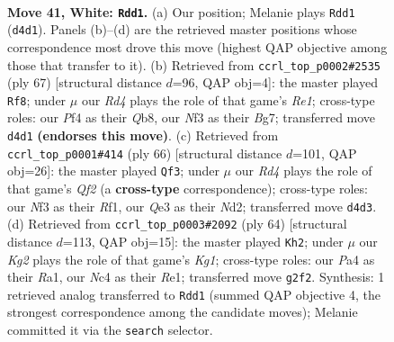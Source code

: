 \documentclass[11pt]{article}
\begin{document}
\clearpage

\begin{figure}[p]\centering
\begin{subfigure}{0.46\textwidth}\centering
\resizebox{\linewidth}{!}{%
\newchessgame
\chessboard[
  setfen={rnb2q2/1p4k1/4p3/p2r1p1p/PnNR1P2/1P2QNP1/4B1KP/7R w - - 1 41},
  showmover=false,
  pgfstyle=straightmove, color=movearrow, markmove={d4-d1}
]}
\caption{}
\end{subfigure}\hfill
\begin{subfigure}{0.46\textwidth}\centering
\resizebox{\linewidth}{!}{%
\newchessgame
\chessboard[
  setfen={1q2r3/5pbk/2rp2pp/1p1NnP1n/1P2P3/7P/P2R1QBK/B4R2 b - - 6 34},
  showmover=false,
  pgfstyle=straightmove, color=movearrow, markmove={e8-f8}
]}
\caption{}
\end{subfigure}
\\[4pt]
\begin{subfigure}{0.46\textwidth}\centering
\resizebox{\linewidth}{!}{%
\newchessgame
\chessboard[
  setfen={1rnqr2k/1p4p1/p2p2bp/P2P1p2/1BNP3b/7P/1RPN1QP1/5RK1 w - - 13 34},
  showmover=false,
  pgfstyle=straightmove, color=movearrow, markmove={f2-f3}
]}
\caption{}
\end{subfigure}\hfill
\begin{subfigure}{0.46\textwidth}\centering
\resizebox{\linewidth}{!}{%
\newchessgame
\chessboard[
  setfen={1rrq2k1/5pp1/p2p1nnp/1b1Pp3/1PN1P3/1Q5P/3N1PP1/R3RBK1 w - - 3 33},
  showmover=false,
  pgfstyle=straightmove, color=movearrow, markmove={g1-h2}
]}
\caption{}
\end{subfigure}
\caption{\textbf{Move 41, White: \texttt{Rdd1}.} (a) Our position; Melanie plays \texttt{Rdd1} (\texttt{d4d1}). Panels (b)--(d) are the retrieved master positions whose correspondence most drove this move (highest QAP objective among those that transfer to it). (b) Retrieved from \texttt{ccrl\_top\_p0002\#2535} (ply 67) [structural distance $d$=96, QAP obj=4]: the master played \texttt{Rf8}; under $\mu$ our \emph{Rd4} plays the role of that game's \emph{Re1}; cross-type roles: our \emph{P}f4 as their \emph{Q}b8, our \emph{N}f3 as their \emph{B}g7; transferred move \texttt{d4d1} \textbf{(endorses this move)}. (c) Retrieved from \texttt{ccrl\_top\_p0001\#414} (ply 66) [structural distance $d$=101, QAP obj=26]: the master played \texttt{Qf3}; under $\mu$ our \emph{Rd4} plays the role of that game's \emph{Qf2} (a \textbf{cross-type} correspondence); cross-type roles: our \emph{N}f3 as their \emph{R}f1, our \emph{Q}e3 as their \emph{N}d2; transferred move \texttt{d4d3}. (d) Retrieved from \texttt{ccrl\_top\_p0003\#2092} (ply 64) [structural distance $d$=113, QAP obj=15]: the master played \texttt{Kh2}; under $\mu$ our \emph{Kg2} plays the role of that game's \emph{Kg1}; cross-type roles: our \emph{P}a4 as their \emph{R}a1, our \emph{N}c4 as their \emph{R}e1; transferred move \texttt{g2f2}. Synthesis: 1 retrieved analog transferred to \texttt{Rdd1} (summed QAP objective 4, the strongest correspondence among the candidate moves); Melanie committed it via the \texttt{search} selector.}
\label{fig:thought-m80}
\end{figure}
\end{document}
